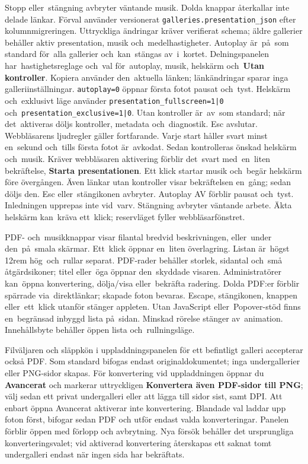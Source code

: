 \documentclass[11pt,a4paper]{article}
\newcommand{\ui}[1]{\textbf{#1}}
\newcommand{\codeword}[1]{\nolinkurl{#1}}
\begin{document}
Stopp eller~stängning avbryter väntande musik. Dolda knappar återkallar inte
delade länkar.
Förval använder versionerat \codeword{galleries.presentation_json} efter
kolumnmigreringen. Uttryckliga ändringar kräver verifierat schema;
äldre gallerier behåller aktiv presentation, musik och~medelhastigheter.
Autoplay är~på~som standard för~alla gallerier och~kan~stängas av~i~kortet.
Delningspanelen har~hastighetsreglage och~val för~autoplay, musik, helskärm
och~\ui{Utan kontroller}. Kopiera använder den~aktuella länken; länkändringar
sparar inga galleriinställningar. \codeword{autoplay=0} öppnar första fotot
pausat och~tyst. Helskärm och~exklusivt läge använder
\codeword{presentation_fullscreen=1|0}
och~\codeword{presentation_exclusive=1|0}.
Utan kontroller är~av~som standard; när det~aktiveras döljs kontroller,
metadata och~diagnostik. Esc avslutar. Webbläsarens ljudregler gäller
fortfarande.
Varje start håller svart minst en~sekund och~tills första fotot är~avkodat.
Sedan kontrolleras önskad helskärm och~musik. Kräver webbläsaren aktivering
förblir det~svart med~en~liten bekräftelse, \ui{Starta presentationen}.
Ett klick startar musik och~begär helskärm före övergången. Även länkar utan
kontroller visar bekräftelsen en~gång; sedan döljs den. Esc eller~stängikonen
avbryter. Autoplay AV förblir pausat och~tyst. Inledningen upprepas inte
vid~varv.
Stängning avbryter väntande arbete. Äkta helskärm kan~kräva ett~klick;
reservläget fyller webbläsarfönstret.

PDF- och~musikknappar visar filantal bredvid beskrivningen,
eller~under den~på~smala skärmar. Ett~klick öppnar en~liten överlagring.
Listan är~högst 12rem hög~och~rullar separat. PDF-rader behåller storlek,
sidantal och~små åtgärdsikoner; titel eller~öga öppnar den~skyddade visaren.
Administratörer kan~öppna konvertering, dölja/visa eller~bekräfta radering.
Dolda PDF:er förblir spärrade via~direktlänkar; skapade foton bevaras.
Escape, stängikonen, knappen eller~ett~klick utanför stänger appleten.
Utan JavaScript eller~Popover-stöd finns en~begränsad inbyggd lista
på~sidan. Minskad rörelse stänger av~animation. Innehållsbyte behåller
öppen lista och~rullningsläge.

Filväljaren och släppkön i uppladdningspanelen för ett befintligt galleri
accepterar också PDF. Som standard bifogas endast originaldokumentet; inga
undergallerier eller PNG-sidor skapas. För konvertering vid uppladdningen öppnar
du \ui{Avancerat} och markerar uttryckligen \ui{Konvertera även PDF-sidor till
PNG}; välj sedan ett privat undergalleri eller att lägga till sidor sist, samt
DPI. Att enbart öppna Avancerat aktiverar inte konvertering. Blandade val laddar
upp foton först, bifogar sedan PDF och utför endast valda konverteringar.
Panelen förblir öppen med förlopp och avbrytning. Nya försök behåller det
ursprungliga konverteringsvalet; vid aktiverad konvertering återskapas ett
saknat tomt undergalleri endast när ingen sida har bekräftats.
\end{document}
